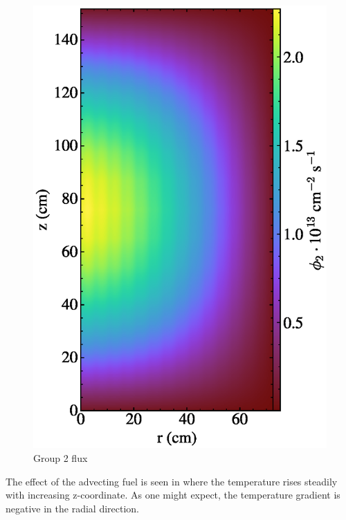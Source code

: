\documentclass{article}
\begin{document}
\begin{figure}
  \centering
  \includegraphics{auto_diff_rho_group2.eps}
  \caption{Group 2 flux}
  \label{fig:group2}
\end{figure}

The effect of the advecting fuel is seen in  where the temperature
rises steadily with increasing z-coordinate. As one might expect, the temperature
gradient is negative in the radial direction.
\end{document}
